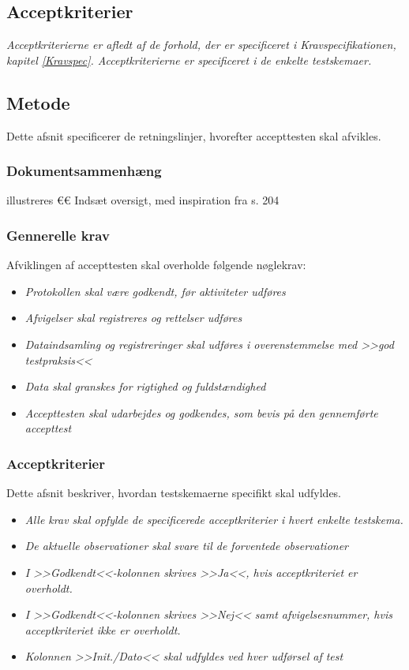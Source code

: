 		\subsection{Acceptkriterier}
		\textit{Acceptkriterierne er afledt af de forhold, der er specificeret i Kravspecifikationen, kapitel \ref{Kravspec}. Acceptkriterierne er specificeret i de enkelte testskemaer.} 
		
		\subsection{Metode}
		Dette afsnit specificerer de retningslinjer, hvorefter accepttesten skal afvikles. 
		
			\subsubsection{Dokumentsammenhæng}
			illustreres 
			€€ Indsæt oversigt, med inspiration fra s. 204 	
			
			\subsubsection{Gennerelle krav}
			Afviklingen af accepttesten skal overholde følgende nøglekrav: 
			
			\begin{itemize}
				\item \textit{Protokollen skal være godkendt, før aktiviteter udføres}
				\item \textit{Afvigelser skal registreres og rettelser udføres}
				\item \textit{Dataindsamling og registreringer skal udføres i overenstemmelse med >>god testpraksis<< }
				\item \textit{Data skal granskes for rigtighed og fuldstændighed }
				\item \textit{Accepttesten skal udarbejdes og godkendes, som bevis på den gennemførte accepttest}
			\end{itemize}
			
			\subsubsection{Acceptkriterier}
			 Dette afsnit beskriver, hvordan testskemaerne specifikt skal udfyldes. 
			 
			 \begin{itemize}
				\item \textit{Alle krav skal opfylde de specificerede acceptkriterier i hvert enkelte testskema.}
				\item \textit{De aktuelle observationer skal svare til de forventede observationer}
				\item \textit{I >>Godkendt<<-kolonnen skrives >>Ja<<, hvis acceptkriteriet er overholdt.} 
				\item \textit{I >>Godkendt<<-kolonnen skrives >>Nej<< samt afvigelsesnummer, hvis acceptkriteriet ikke er overholdt.}  \item \textit{Kolonnen >>Init./Dato<< skal udfyldes ved hver udførsel af test}
			\end{itemize}
			
